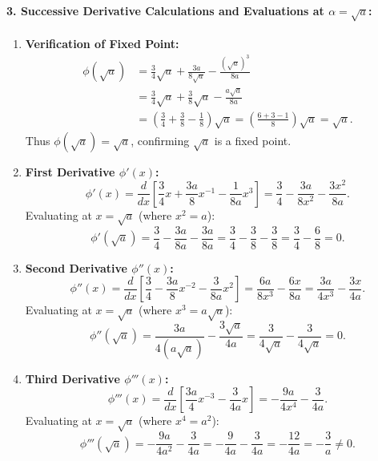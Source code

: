 \documentclass[11pt,a4paper]{article}
\begin{document}
\paragraph{3. Successive Derivative Calculations and Evaluations at $\alpha = \sqrt{a}$:}
\begin{enumerate}[label=\textbf{Step \arabic*:}, leftmargin=2cm]
    \item \textbf{Verification of Fixed Point:}
    \begin{align*}
    \phi(\sqrt{a}) &= \frac{3}{4}\sqrt{a} + \frac{3a}{8\sqrt{a}} - \frac{(\sqrt{a})^3}{8a} \\
                   &= \frac{3}{4}\sqrt{a} + \frac{3}{8}\sqrt{a} - \frac{a\sqrt{a}}{8a} \\
                   &= \left(\frac{3}{4} + \frac{3}{8} - \frac{1}{8}\right)\sqrt{a} = \left(\frac{6 + 3 - 1}{8}\right)\sqrt{a} = \sqrt{a}.
    \end{align*}
    Thus $\phi(\sqrt{a}) = \sqrt{a}$, confirming $\sqrt{a}$ is a fixed point.

    \item \textbf{First Derivative $\phi'(x)$:}
    \[
    \phi'(x) = \frac{d}{dx}\left[\frac{3}{4}x + \frac{3a}{8}x^{-1} - \frac{1}{8a}x^3\right] = \frac{3}{4} - \frac{3a}{8x^2} - \frac{3x^2}{8a}.
    \]
    Evaluating at $x = \sqrt{a}$ (where $x^2 = a$):
    \[
    \phi'(\sqrt{a}) = \frac{3}{4} - \frac{3a}{8a} - \frac{3a}{8a} = \frac{3}{4} - \frac{3}{8} - \frac{3}{8} = \frac{3}{4} - \frac{6}{8} = 0.
    \]

    \item \textbf{Second Derivative $\phi''(x)$:}
    \[
    \phi''(x) = \frac{d}{dx}\left[\frac{3}{4} - \frac{3a}{8}x^{-2} - \frac{3}{8a}x^2\right] = \frac{6a}{8x^3} - \frac{6x}{8a} = \frac{3a}{4x^3} - \frac{3x}{4a}.
    \]
    Evaluating at $x = \sqrt{a}$ (where $x^3 = a\sqrt{a}$):
    \[
    \phi''(\sqrt{a}) = \frac{3a}{4(a\sqrt{a})} - \frac{3\sqrt{a}}{4a} = \frac{3}{4\sqrt{a}} - \frac{3}{4\sqrt{a}} = 0.
    \]

    \item \textbf{Third Derivative $\phi'''(x)$:}
    \[
    \phi'''(x) = \frac{d}{dx}\left[\frac{3a}{4}x^{-3} - \frac{3}{4a}x\right] = -\frac{9a}{4x^4} - \frac{3}{4a}.
    \]
    Evaluating at $x = \sqrt{a}$ (where $x^4 = a^2$):
    \[
    \phi'''(\sqrt{a}) = -\frac{9a}{4a^2} - \frac{3}{4a} = -\frac{9}{4a} - \frac{3}{4a} = -\frac{12}{4a} = -\frac{3}{a} \neq 0.
    \]
\end{enumerate}
\end{document}
